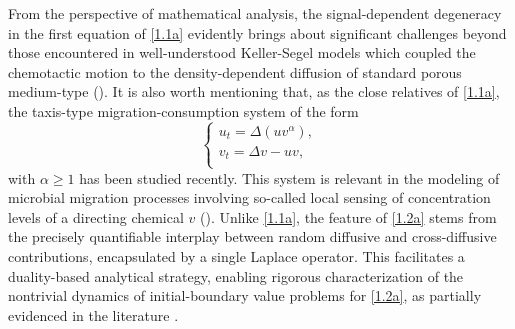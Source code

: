 \documentclass[12pt]{article}
\theoremstyle{plain}
\theoremstyle{definition}
\numberwithin{equation}{section}
\begin{document}
From the perspective of mathematical analysis, the signal-dependent degeneracy in the first  equation  of
  \eqref{1.1a}
 evidently brings about significant challenges beyond those encountered in  well-understood Keller-Segel
 models which  coupled the chemotactic motion  to the density-dependent diffusion of standard porous medium-type
(\cite{Lankeit,Blanchet,WinklerMAS2025}).  It is also worth mentioning that, as the close relatives  of  \eqref{1.1a},  the taxis-type migration-consumption system of the form
\begin{equation}\label{1.2a}
\left\{\begin{array}{ll}
		u_{t}=\Delta(uv^\alpha),\\
		v_{t}=\Delta v-uv,\\
	\end{array}
		\right.
\end{equation}
with $\alpha\geq 1$ has been studied recently.  This system is relevant in the modeling of microbial migration processes
involving so-called local sensing of concentration levels of a directing chemical $v$ (\cite{Fu,Liu}).
Unlike \eqref{1.1a}, the feature of \eqref{1.2a} stems from  the precisely   quantifiable interplay  between random diffusive and cross-diffusive contributions,  encapsulated by a single Laplace operator. %
This facilitates a duality-based analytical strategy, enabling rigorous characterization of the nontrivial dynamics of initial-boundary value problems for \eqref{1.2a}, as partially evidenced %
in the literature \cite{Winkler(2024),Li Winkler(2022R),Winkler(2023Non),WinklerMAS2025,Laurenot}.


\end{document}
